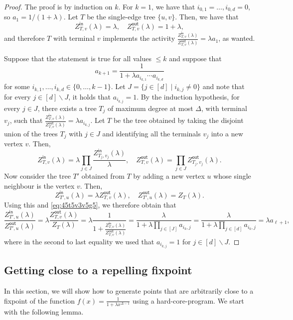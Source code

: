 \documentclass[11pt]{article}
\def\Zin{Z^{\mathsf{in}}}
\def\Zout{Z^{\mathsf{out}}}
\begin{document}
\begin{proof}
The proof is by induction on $k$. For $k=1$, we have that $i_{0,1}=\hdots,i_{0,d}=0$, so $a_1=1/(1+\lambda)$. Let $T$ be the single-edge tree $\{u,v\}$. Then, we have that
\[\Zin_{T,v}(\lambda)=\lambda, \quad \Zout_{T,v}(\lambda)=1+\lambda,\]
and therefore $T$ with terminal $v$ implements the activity $\frac{\Zin_{T,v}(\lambda)}{\Zout_{T,v}(\lambda)}=\lambda a_1$, as wanted.

Suppose that the statement is true for all values $\leq k$ and suppose that 
\[a_{k+1}=\frac{1}{1+\lambda a_{i_{k,1}}\cdots a_{i_{k,d}}}\]
for some $i_{k,1},\dots,i_{k,d}\in\{0,\dots,k-1\}$. Let 
$J=\{j\in [d] \mid i_{k,j}\neq 0\}$ and note that for every $j\in [d]\backslash J$, it holds that $a_{i_{k,j}}=1$. By the induction hypothesis, for every $j\in J$, there exists a tree $T_j$ of maximum degree at most $\Delta$, with terminal $v_j$, such that $\frac{\Zin_{T,v}(\lambda)}{\Zout_{T,v}(\lambda)}=\lambda a_{i_{k,j}}$. Let $T$ be the tree obtained by taking the disjoint union of the trees $T_j$ with $j\in J$ and identifying all the terminals $v_j$ into a new vertex $v$. Then,
\begin{equation}\label{eq:45t5v3v5g5}
\Zin_{T,v}(\lambda)=\lambda\prod_{j\in J}\frac{\Zin_{T_j,v_j}(\lambda)}{\lambda}, \quad \Zout_{T,v}(\lambda)=\prod_{j\in J}\Zout_{T_j,v_j}(\lambda).
\end{equation}
Now consider the tree $T'$ obtained from $T$ by adding a new vertex $u$ whose single neighbour is the vertex $v$. Then,
\[\Zin_{T',u}(\lambda)=\lambda \Zout_{T,v}(\lambda), \quad \Zout_{T',u}(\lambda)=Z_{T}(\lambda).\]
Using this and \eqref{eq:45t5v3v5g5}, we therefore obtain that
\[\frac{\Zin_{T',u}(\lambda)}{\Zout_{T',u}(\lambda)}=\lambda\frac{\Zout_{T,v}(\lambda)}{Z_{T}(\lambda)}=\lambda\frac{1}{1+\frac{\Zin_{T,v}(\lambda)}{\Zout_{T,v}(\lambda)}}=\frac{\lambda}{1+\lambda \prod_{j\in [J]}a_{i_k,j}}=\frac{\lambda}{1+\lambda \prod_{j\in [d]}a_{i_k,j}}=\lambda a_{\ell+1},\]
where in the second to last equality we used that $a_{i_{k,j}}=1$ for $j\in [d]\backslash J$.
\end{proof}



\subsection{Getting close to a repelling fixpoint}\label{sec:f4ggefr}

In this section, we will show how to generate points that are arbitrarily close to a fixpoint of the function $f(x)=\frac{1}{1+\lambda x^{\Delta-1}}$ using a hard-core-program. We start with the following lemma.
\end{document}
